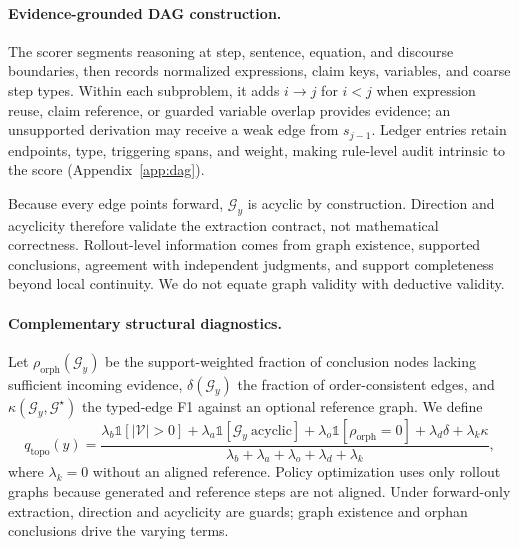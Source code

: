 \paragraph{Evidence-grounded DAG construction.}
The scorer segments reasoning at step, sentence, equation, and discourse boundaries, then records normalized expressions, claim keys, variables, and coarse step types. Within each subproblem, it adds $i\!\to\!j$ for $i<j$ when expression reuse, claim reference, or guarded variable overlap provides evidence; an unsupported derivation may receive a weak edge from $s_{j-1}$. Ledger entries retain endpoints, type, triggering spans, and weight, making rule-level audit intrinsic to the score (Appendix~\ref{app:dag}).

Because every edge points forward, $\mathcal{G}_y$ is acyclic by construction. Direction and acyclicity therefore validate the extraction contract, not mathematical correctness. Rollout-level information comes from graph existence, supported conclusions, agreement with independent judgments, and support completeness beyond local continuity. We do not equate graph validity with deductive validity.

\paragraph{Complementary structural diagnostics.}
Let $\rho_{\mathrm{orph}}(\mathcal{G}_y)$ be the support-weighted fraction of conclusion nodes lacking sufficient incoming evidence, $\delta(\mathcal{G}_y)$ the fraction of order-consistent edges, and $\kappa(\mathcal{G}_y,\mathcal{G}^{\star})$ the typed-edge F1 against an optional reference graph. We define
\begin{equation}
\label{eq:qtopo}
q_{\mathrm{topo}}(y)=
\frac{\lambda_b\mathbb{1}[|\mathcal{V}|>0]+\lambda_a\mathbb{1}[\mathcal{G}_y\ \mathrm{acyclic}]+\lambda_o\mathbb{1}[\rho_{\mathrm{orph}}=0]+\lambda_d\delta+\lambda_k\kappa}
{\lambda_b+\lambda_a+\lambda_o+\lambda_d+\lambda_k},
\end{equation}
where $\lambda_k=0$ without an aligned reference. Policy optimization uses only rollout graphs because generated and reference steps are not aligned. Under forward-only extraction, direction and acyclicity are guards; graph existence and orphan conclusions drive the varying terms.

